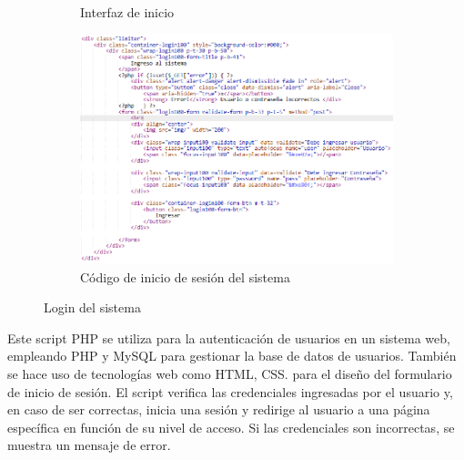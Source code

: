 \begin{figure}[H]
\begin{center}
\begin{subfigure}{0.28\textwidth}
            \caption{Interfaz de inicio}
        \end{subfigure}
        \hspace{0.05\textwidth}
        \begin{subfigure}{0.62\textwidth}
            \includegraphics[width=\linewidth]{./sistema/codigo_login.png}
            \caption{Código de inicio de sesión del sistema}
        \end{subfigure}
        \caption{Login del sistema}
        \label{fig:login}
    \end{center}
\end{figure}

Este script PHP se utiliza para la autenticación de usuarios en un sistema web, empleando PHP y MySQL para gestionar la base de datos de usuarios. También se hace uso de tecnologías web como HTML, CSS. para el diseño del formulario de inicio de sesión. El script verifica las credenciales ingresadas por el usuario y, en caso de ser correctas, inicia una sesión y redirige al usuario a una página específica en función de su nivel de acceso. Si las credenciales son incorrectas, se muestra un mensaje de error.


